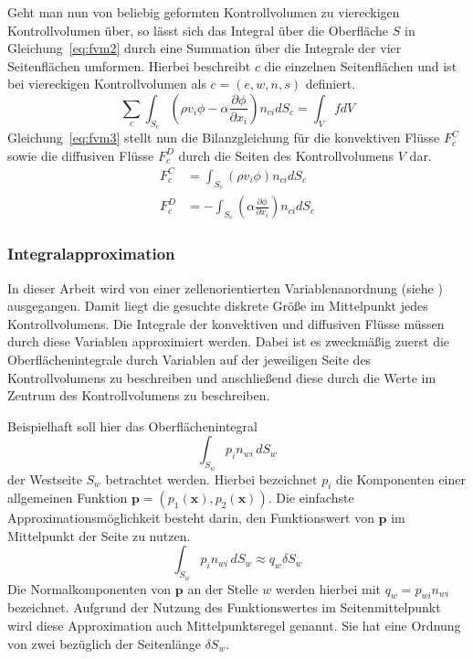 Geht man nun von beliebig geformten Kontrollvolumen zu viereckigen Kontrollvolumen über,
so lässt sich das Integral über die Oberfläche $S$ in Gleichung~\ref{eq:fvm2} durch eine
Summation über die Integrale der vier Seitenflächen umformen. Hierbei beschreibt $c$ die
einzelnen Seitenflächen und ist bei viereckigen Kontrollvolumen als $c=(e,w,n,s)$ definiert.
\begin{equation}
  \sum_c \int_{S_c} \left(\rho v_i \phi - \alpha \frac{\partial \phi}{\partial x_i}
\right) n_{ci} dS_c = \int_V f dV\label{eq:fvm3}
\end{equation}
Gleichung~\ref{eq:fvm3} stellt nun die Bilanzgleichung für die konvektiven Flüsse
$F_c^C$ sowie die diffusiven Flüsse $F_c^D$ durch die Seiten des Kontrollvolumens $V$ dar.
\begin{align}
  F_c^C &=  \int_{S_c} \left(\rho v_i \phi \right) n_{ci} dS_c \\
  F_c^D &=  -\int_{S_c} \left(\alpha \frac{\partial \phi}{\partial x_i}\right) n_{ci} dS_c 
\end{align}

\subsubsection{Integralapproximation}
\label{sec:fvm_intappr}

In dieser Arbeit wird von einer zellenorientierten Variablenanordnung (siehe \cite{num_maschbau})
ausgegangen. Damit liegt die gesuchte diskrete Größe im Mittelpunkt jedes Kontrollvolumens.
Die Integrale der konvektiven und diffusiven Flüsse müssen durch diese Variablen
approximiert werden. Dabei ist es zweckmäßig zuerst die Oberflächenintegrale durch Variablen
auf der jeweiligen Seite des Kontrollvolumens zu beschreiben und anschließend diese durch die Werte
im Zentrum des Kontrollvolumens zu beschreiben.

Beispielhaft soll hier das Oberflächenintegral
\begin{equation*}
  \int_{S_w} p_i n_{wi}\,dS_w
\end{equation*}
der Westseite $S_w$ betrachtet werden. Hierbei bezeichnet $p_i$ die Komponenten einer allgemeinen
Funktion $\mathbf{p} = (p_1(\mathbf{x}), p_2(\mathbf{x}))$. Die einfachste
Approximationsmöglichkeit besteht darin, den Funktionswert von $\mathbf{p}$ im Mittelpunkt
der Seite zu nutzen.
\begin{equation}
  \int_{S_w} p_i n_{wi}\,dS_w \approx q_w \delta S_w
\end{equation}
Die Normalkomponenten von $\mathbf{p}$ an der Stelle $w$ werden hierbei mit $q_w = p_{wi} n_{wi}$ bezeichnet.
Aufgrund der Nutzung des Funktionswertes im Seitenmittelpunkt wird diese Approximation auch Mittelpunktsregel genannt.
Sie hat eine Ordnung von zwei bezüglich der Seitenlänge $\delta S_w$.

